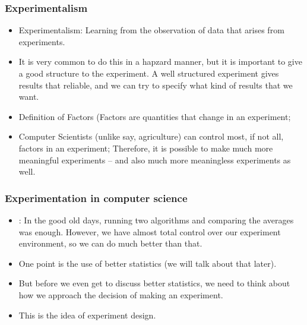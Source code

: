 \documentclass{beamer}
\begin{document}
\begin{frame}
  \frametitle{Experimentalism}
  \begin{itemize}
    \item Experimentalism: Learning from the observation of data that
      arises from experiments.
    \item It is very common to do this in a hapzard manner, but it is
      important to give a good structure to the experiment. A well
      structured experiment gives results that reliable, and we can
      try to specify what kind of results that we want.
    \item Definition of Factors (Factors are quantities that change in
      an experiment;
    \item Computer Scientists (unlike say, agriculture) can control
      most, if not all, factors in an experiment; Therefore, it is
      possible to make much more meaningful experiments -- and also
      much more meaningless experiments as well.
  \end{itemize}
\end{frame}

\begin{frame}
  \frametitle{Experimentation in computer science}
  \begin{itemize}
  \item {}: In the good old days, running
    two algorithms and comparing the averages was enough. However,
    we have almost total control over our experiment environment, so
    we can do much better than that.
  \item One point is the use of better statistics (we will talk
    about that later).
  \item But before we even get to discuss better statistics, we need
    to think about how we approach the decision of making an
    experiment.
  \item This is the idea of experiment design.
  \end{itemize}
\end{frame}
\end{document}
